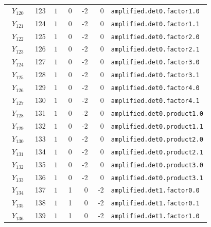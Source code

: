 {\begin{longtable}{@{}r r c r r r p{0.49\linewidth}@{}}
\(Y_{120}\) & 123 & \(1\) & 0 & -2 & 0 & \texttt{amplified.\allowbreak{}det0.\allowbreak{}factor1.\allowbreak{}0} \\
\(Y_{121}\) & 124 & \(1\) & 0 & -2 & 0 & \texttt{amplified.\allowbreak{}det0.\allowbreak{}factor1.\allowbreak{}1} \\
\(Y_{122}\) & 125 & \(1\) & 0 & -2 & 0 & \texttt{amplified.\allowbreak{}det0.\allowbreak{}factor2.\allowbreak{}0} \\
\(Y_{123}\) & 126 & \(1\) & 0 & -2 & 0 & \texttt{amplified.\allowbreak{}det0.\allowbreak{}factor2.\allowbreak{}1} \\
\(Y_{124}\) & 127 & \(1\) & 0 & -2 & 0 & \texttt{amplified.\allowbreak{}det0.\allowbreak{}factor3.\allowbreak{}0} \\
\(Y_{125}\) & 128 & \(1\) & 0 & -2 & 0 & \texttt{amplified.\allowbreak{}det0.\allowbreak{}factor3.\allowbreak{}1} \\
\(Y_{126}\) & 129 & \(1\) & 0 & -2 & 0 & \texttt{amplified.\allowbreak{}det0.\allowbreak{}factor4.\allowbreak{}0} \\
\(Y_{127}\) & 130 & \(1\) & 0 & -2 & 0 & \texttt{amplified.\allowbreak{}det0.\allowbreak{}factor4.\allowbreak{}1} \\
\(Y_{128}\) & 131 & \(1\) & 0 & -2 & 0 & \texttt{amplified.\allowbreak{}det0.\allowbreak{}product1.\allowbreak{}0} \\
\(Y_{129}\) & 132 & \(1\) & 0 & -2 & 0 & \texttt{amplified.\allowbreak{}det0.\allowbreak{}product1.\allowbreak{}1} \\
\(Y_{130}\) & 133 & \(1\) & 0 & -2 & 0 & \texttt{amplified.\allowbreak{}det0.\allowbreak{}product2.\allowbreak{}0} \\
\(Y_{131}\) & 134 & \(1\) & 0 & -2 & 0 & \texttt{amplified.\allowbreak{}det0.\allowbreak{}product2.\allowbreak{}1} \\
\(Y_{132}\) & 135 & \(1\) & 0 & -2 & 0 & \texttt{amplified.\allowbreak{}det0.\allowbreak{}product3.\allowbreak{}0} \\
\(Y_{133}\) & 136 & \(1\) & 0 & -2 & 0 & \texttt{amplified.\allowbreak{}det0.\allowbreak{}product3.\allowbreak{}1} \\
\(Y_{134}\) & 137 & \(1\) & 1 & 0 & -2 & \texttt{amplified.\allowbreak{}det1.\allowbreak{}factor0.\allowbreak{}0} \\
\(Y_{135}\) & 138 & \(1\) & 1 & 0 & -2 & \texttt{amplified.\allowbreak{}det1.\allowbreak{}factor0.\allowbreak{}1} \\
\(Y_{136}\) & 139 & \(1\) & 1 & 0 & -2 & \texttt{amplified.\allowbreak{}det1.\allowbreak{}factor1.\allowbreak{}0} \\

\end{longtable}}
